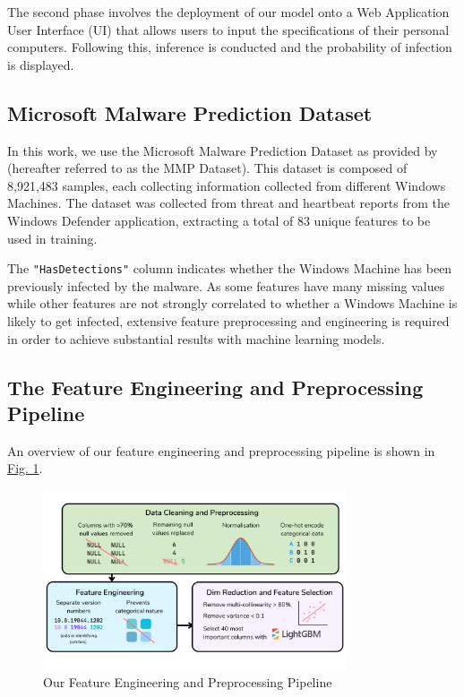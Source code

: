 \documentclass[pdflatex,sn-basic,10pt]{sn-jnl}%
\newcommand{\reffig}[1]{\hyperref[#1]{Fig. \ref*{#1}}}
\begin{document}
The second phase involves the deployment of our model onto a Web Application User Interface (UI) that allows users to input the specifications of their personal computers. Following this, inference is conducted and the probability of infection is displayed.

\subsection{Microsoft Malware Prediction Dataset}\label{subsec:microsoft-malware-prediction-dataset}

In this work, we use the Microsoft Malware Prediction Dataset as provided by \cite{microsoft-malware-prediction} (hereafter referred to as the MMP Dataset). This dataset is composed of 8,921,483 samples, each collecting information collected from different Windows Machines. The dataset was collected from threat and heartbeat reports from the Windows Defender application, extracting a total of 83 unique features to be used in training.

The \texttt{"HasDetections"} column indicates whether the Windows Machine has been previously infected by the malware.
As some features have many missing values while other features are not strongly correlated to whether a Windows Machine is likely to get infected, extensive feature preprocessing and engineering is required in order to achieve substantial results with machine learning models.

\subsection{The Feature Engineering and Preprocessing Pipeline}\label{subsec:feature-engineering-and-preprocessing}

An overview of our feature engineering and preprocessing pipeline is shown in \reffig{fig:fig-2}.

\begin{figure}[!t]
\includegraphics[width=0.8\textwidth]{images/feature_engineering}
\centering
\caption{Our Feature Engineering and Preprocessing Pipeline}
\label{fig:fig-2}
\end{figure}
\end{document}
